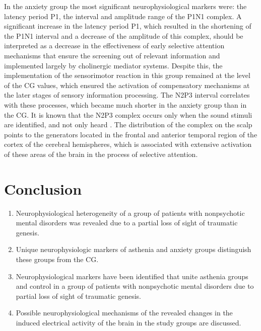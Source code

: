 \documentclass[twocolumn]{article}
\begin{document}
\par In the anxiety group the most significant neurophysiological markers were: the latency period P1, the interval and amplitude range of the P1N1 complex. A significant increase in the latency period P1, which resulted in the shortening of the P1N1 interval and a decrease of the amplitude of this complex, should be interpreted as a decrease in the effectiveness of early selective attention mechanisms that ensure the screening out of relevant information and implemented largely by cholinergic mediator systems. Despite this, the implementation of the sensorimotor reaction in this group remained at the level of the CG values, which ensured the activation of compensatory mechanisms at the later stages of sensory information processing. The N2P3 interval correlates with these processes, which became much shorter in the anxiety group than in the CG. It is known that the N2P3 complex occurs only when the sound stimuli are identified, and not only heard \cite{bib35}. The distribution of the complex on the scalp points to the generators located in the frontal and anterior temporal region of the cortex of the cerebral hemispheres, which is associated with extensive activation of these areas of the brain in the process of selective attention. 
\section {Conclusion}
\begin{enumerate}
\item Neurophysiological heterogeneity of a group of patients with nonpsychotic mental disorders was revealed due to a partial loss of sight of traumatic genesis.
\item Unique neurophysiologic markers of asthenia and anxiety groups distinguish these groups from the CG.
\item Neurophysiological markers have been identified that unite asthenia groups and control in a group of patients with nonpsychotic mental disorders due to partial loss of sight of traumatic genesis.
\item Possible neurophysiological mechanisms of the revealed changes in the induced electrical activity of the brain in the study groups are discussed.
\end{enumerate}
\end{document}
